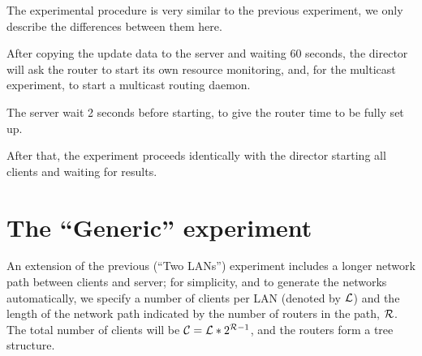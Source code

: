 \documentclass[a4paper,12pt]{article}
\begin{document}
The experimental procedure is very similar to the previous experiment,
we only describe the differences between them here.

After copying the update data to the server and waiting 60 seconds, the
director will ask the router to start its own resource monitoring, and,
for the multicast experiment, to start a multicast routing daemon.

The server wait 2 seconds before starting, to give the router time to be
fully set up.

After that, the experiment proceeds identically with the director starting
all clients and waiting for results.

\section{The ``Generic'' experiment}
\label{GEN:experiment}

An extension of the previous (``Two LANs'') experiment includes a longer
network path between clients and server; for simplicity, and to generate
the networks automatically, we specify a number of clients per LAN
(denoted by ${\cal L}$) and the length of the network path indicated by
the number of routers in the path, ${\cal R}$. The total number of clients
will be ${\cal C} = {\cal L} * 2^{{\cal R} - 1}$, and the routers form a
tree structure.
\end{document}
